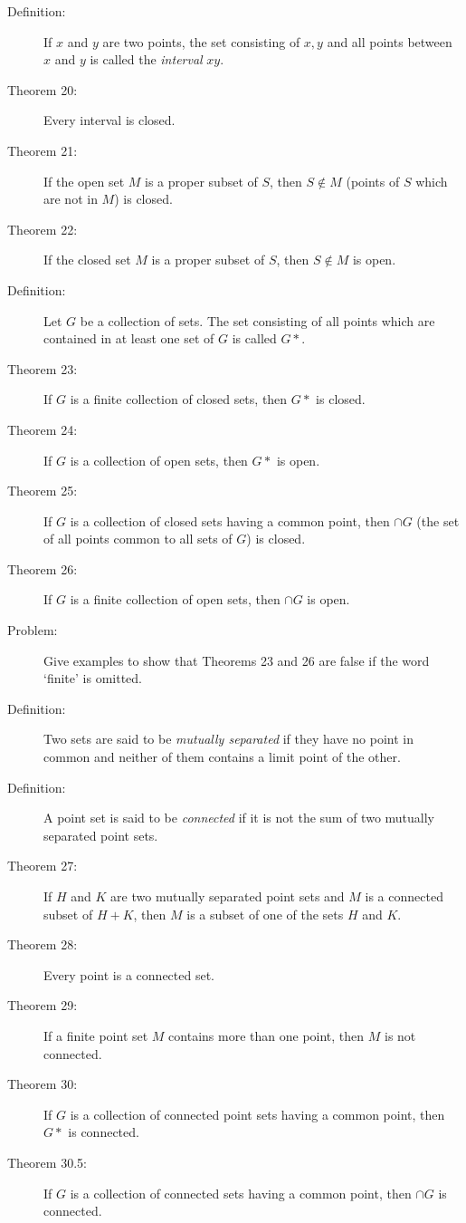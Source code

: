 \documentclass{article}
\begin{document}
\begin{description}
  \item[Definition:] If $x$ and $y$ are two points, the set consisting of $x,y$ and all points between $x$ and $y$ is called the \emph{interval} $xy$.
  \item[Theorem 20:] Every interval is closed.
  \item[Theorem 21:] If the open set $M$ is a proper subset of $S$, then $S \notin M$ (points of $S$ which are not in $M$) is closed.
  \item[Theorem 22:] If the closed set $M$ is a proper subset of $S$, then $S \notin M$ is open.
  \item[Definition:] Let $G$ be a collection of sets. The set consisting of all points which are contained in at least one set of $G$ is called $G*$.
  \item[Theorem 23:] If $G$ is a finite collection of closed sets, then $G*$ is closed.
  \item[Theorem 24:] If $G$ is a collection of open sets, then $G*$ is open.
  \item[Theorem 25:] If $G$ is a collection of closed sets having a common point, then $\cap G$ (the set of all points common to all sets of $G$) is closed.
  \item[Theorem 26:] If $G$ is a finite collection of open sets, then $\cap G$ is open.
  \item[Problem:] Give examples to show that Theorems 23 and 26 are false if the word `finite' is omitted.
  \item[Definition:] Two sets are said to be \emph{mutually separated} if they have no point in common and neither of them contains a limit point of the other.
  \item[Definition:] A point set is said to be \emph{connected} if it is not the sum of two mutually separated point sets.
  \item[Theorem 27:] If $H$ and $K$ are two mutually separated point sets and $M$ is a connected subset of $H+K$, then $M$ is a subset of one of the sets $H$ and $K$.
  \item[Theorem 28:] Every point is a connected set.
  \item[Theorem 29:] If a finite point set $M$ contains more than one point, then $M$ is not connected.
  \item[Theorem 30:] If $G$ is a collection of connected point sets having a common point, then $G*$ is connected.
  \item[Theorem 30.5:] If $G$ is a collection of connected sets having a common point, then $\cap G$ is connected.

\end{description}
\end{document}
